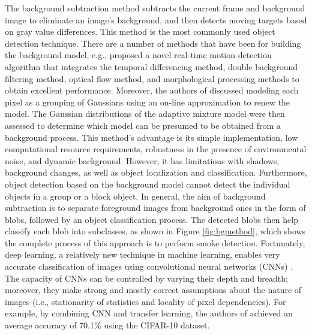 The background subtraction method \cite{lee2012adaptive}\cite{stauffer1999adaptive} subtracts the current frame and background image to eliminate an image’s background, and then detects moving targets based on gray value differences. This method is the most commonly used object detection technique. There are a number of methods that have been for building the background model, e.g.,  \cite{lu2008improved} proposed a novel real-time motion detection algorithm that integrates the temporal differencing method, double background filtering method, optical flow method, and morphological processing methods to obtain excellent performance. Moreover, the authors of \cite{stauffer1999adaptive} discussed modeling each pixel as a grouping of Gaussians using an on-line approximation to renew the model. The Gaussian distributions of the adaptive mixture model were then assessed to determine which model can be presumed to be obtained from a background process. This method’s advantage is its simple implementation, low computational resource requirements, robustness in the presence of environmental noise, and dynamic background. However, it has limitations with shadows, background changes, as well as object localization and classification. Furthermore, object detection based on the background model cannot detect the individual objects in a group or a block object. In general, the aim of background subtraction is to separate foreground images from background ones in the form of blobs, followed by an object classification process. The detected blobs then help classify each blob into subclasses, as shown in Figure \ref{fig:bgmethod}, which shows the complete process of this approach is to perform smoke detection. Fortunately, deep learning, a relatively new technique in machine learning, enables very accurate classification of images using convolutional neural networks (CNNs) \cite{lecun2010convolutional}\cite{jarrett2009best}\cite{lee2009convolutional}. The capacity of CNNs can be controlled by varying their depth and breadth; moreover, they make strong and mostly correct assumptions about the nature of images (i.e., stationarity of statistics and locality of pixel dependencies). For example, by combining CNN and transfer learning, the authors of \cite{hussain2018study} achieved an average accuracy of 70.1\% using the CIFAR-10  \cite{krizhevsky2009learning} dataset.

